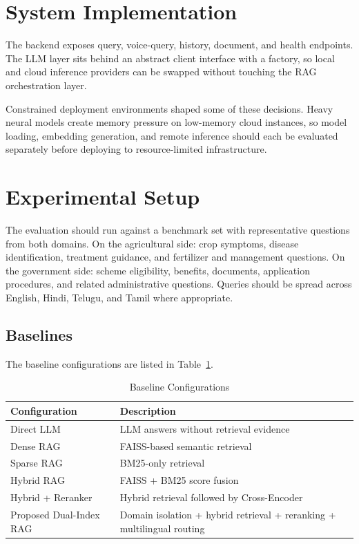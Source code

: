 \documentclass[10pt,twocolumn,letterpaper]{article}
\begin{document}
\section{System Implementation}
The backend exposes query, voice-query, history, document, and health endpoints. The LLM layer sits behind an abstract client interface with a factory, so local and cloud inference providers can be swapped without touching the RAG orchestration layer.

Constrained deployment environments shaped some of these decisions. Heavy neural models create memory pressure on low-memory cloud instances, so model loading, embedding generation, and remote inference should each be evaluated separately before deploying to resource-limited infrastructure.

\section{Experimental Setup}
The evaluation should run against a benchmark set with representative questions from both domains. On the agricultural side: crop symptoms, disease identification, treatment guidance, and fertilizer and management questions. On the government side: scheme eligibility, benefits, documents, application procedures, and related administrative questions. Queries should be spread across English, Hindi, Telugu, and Tamil where appropriate.

\subsection{Baselines}
The baseline configurations are listed in Table~\ref{tab:baselines}.

\begin{table}[t]
\caption{Baseline Configurations}
\label{tab:baselines}
\centering
\footnotesize
\begin{tabular}{@{}p{2.3cm}p{5.0cm}@{}}
\toprule
\textbf{Configuration} & \textbf{Description} \\
\midrule
Direct LLM & LLM answers without retrieval evidence \\
Dense RAG & FAISS-based semantic retrieval \\
Sparse RAG & BM25-only retrieval \\
Hybrid RAG & FAISS + BM25 score fusion \\
Hybrid + Reranker & Hybrid retrieval followed by Cross-Encoder \\
Proposed Dual-Index RAG & Domain isolation + hybrid retrieval + reranking + multilingual routing \\
\bottomrule
\end{tabular}
\end{table}
\end{document}
